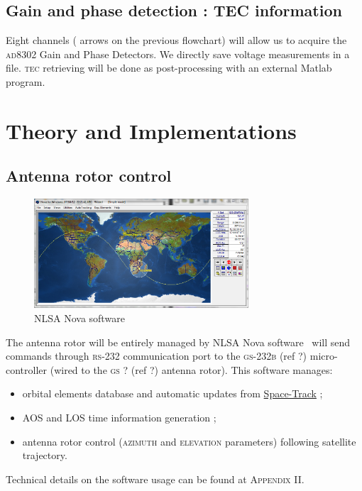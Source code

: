\documentclass[twocolumn,pre,floats,aps,amsmath,amssymb]{revtex4}
\newenvironment{remark}[1][Remarque.]{\begin{trivlist}
\item[\hskip \labelsep {\bfseries #1}]}{\end{trivlist}}
\begin{document}
\subsection{Gain and phase detection : TEC information}

Eight channels ({ \color{oneblue}{blue} } arrows on the previous flowchart) will allow us to acquire the \textsc{ad8302} Gain and Phase Detectors. We directly save voltage measurements in a file. \textsc{tec} retrieving will be done as post-processing with an external Matlab program.

\section{Theory and Implementations}
\label{sec:theory}

\subsection{Antenna rotor control}

\begin{figure}[h]
  \includegraphics[width=8cm]{pictures/nova3.png}
\caption{NLSA Nova software}
\label{fig:nlsa_nova}
\end{figure}

The antenna rotor will be entirely managed by NLSA Nova software~\cite{nova_um} will send commands through \textsc{rs-232} communication port to the \textsc{gs-232b} (ref ?) micro-controller (wired to the \textsc{gs ?} (ref ?) antenna rotor). This software manages:
\begin {itemize}
\item {orbital elements database and automatic updates from \href{https://www.space-track.org}{Space-Track} ;}
\item {AOS and LOS time information generation ;}
\item {antenna rotor control (\textsc{azimuth} and \textsc{elevation} parameters) following satellite trajectory.}
\end {itemize}

\begin{remark}
  Technical details on the software usage can be found at \textsc{Appendix II}.
\end{remark}
\end{document}
